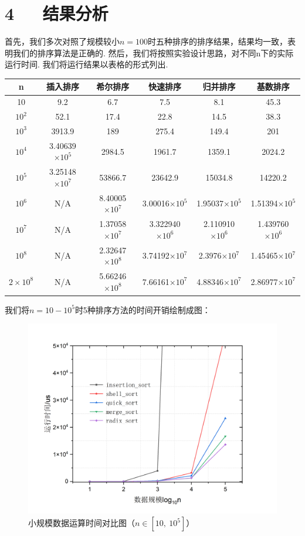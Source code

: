 \documentclass[UTF8]{ctexart}
\begin{document}
\section*{4\ \ \ 结果分析}
首先，我们多次对照了规模较小$n=100$时五种排序的排序结果，结果均一致，表明我们的排序算法是正确的. 然后，我们将按照实验设计思路，对不同n下的实际运行时间. 我们将运行结果以表格的形式列出. 
\begin{table}[H]
	\begin{center}
		\begin{tabular}{c|c|c|c|c|c}
			\hline
			n&插入排序&希尔排序&快速排序&归并排序&基数排序\\
			\hline
			\hline
			10 &9.2&	6.7	&7.5&	8.1	&45.3\\
			\hline
			$10^2$ & 52.1	&17.4	&22.8	&14.5	&38.3\\
			\hline
			$10^3$ & 3913.9	&189	&275.4&	149.4&	201\\
			\hline
			$10^4$ & 3.40639$\times{10^5}$	&2984.5	&1961.7&	1359.1&	2024.2\\
			\hline
			$10^5$ & 3.25148$\times{10^7}$&	53866.7	&23642.9&	15034.8&	14220.2\\
			\hline
			$10^6$ &N/A& 8.40005$\times{10^7}$	&3.00016$\times{10^5}$	&1.95037$\times{10^5}$&	1.51394$\times{10^5}$\\
			\hline
			$10^7$ &N/A& 1.37058$\times{10^7}$&	3.322940$\times{10^6}$	&2.110910$\times{10^6}$&	1.439760$\times{10^6}$\\
			\hline
			$10^8$ &N/A& 2.32647$\times{10^8}$	&3.74192$\times{10^7}$	&2.3976$\times{10^7}$&	1.45465$\times{10^7}$\\
			\hline
			$2\times 10^8$&N/A & 5.66246$\times{10^8}$&	7.66161$\times{10^7}$	&4.88346$\times{10^7}$	&2.86977$\times{10^7}$\\
			\hline
		\end{tabular}
\end{center}\end{table}
我们将$n=10-10^5$时5种排序方法的时间开销绘制成图：
\begin{figure}[H]\begin{center}
	\includegraphics[scale=0.5]{graph1.png}
\caption{小规模数据运算时间对比图（$n\in [10,\ 10^5]$）}
\end{center}\end{figure}
\end{document}
